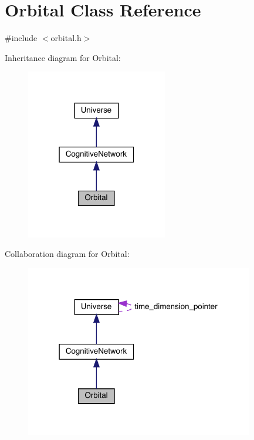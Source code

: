 \hypertarget{class_orbital}{}\section{Orbital Class Reference}
\label{class_orbital}


{\ttfamily \#include $<$orbital.\+h$>$}



Inheritance diagram for Orbital\+:\nopagebreak
\begin{figure}[H]
\begin{center}
\leavevmode
\includegraphics[width=175pt]{class_orbital__inherit__graph}
\end{center}
\end{figure}


Collaboration diagram for Orbital\+:\nopagebreak
\begin{figure}[H]
\begin{center}
\leavevmode
\includegraphics[width=283pt]{class_orbital__coll__graph}
\end{center}
\end{figure}

